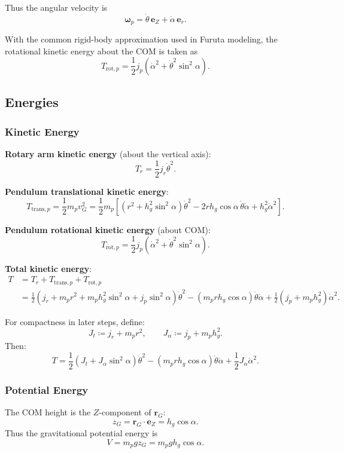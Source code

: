 \documentclass[12pt,a4paper]{article}
\begin{document}
Thus the angular velocity is
\[
\bm\omega_p=\dot\theta\,\bm e_Z+\dot\alpha\,\bm e_r.
\]

With the common rigid-body approximation used in Furuta modeling,
the rotational kinetic energy about the COM is taken as
\[
T_{\text{rot},p}=\frac{1}{2}j_p\left(\dot\alpha^2+\dot\theta^2\sin^2\alpha\right).
\]

\subsection{Energies}

\subsubsection{Kinetic Energy}

\textbf{Rotary arm kinetic energy} (about the vertical axis):
\[
T_r=\frac{1}{2}j_r\dot\theta^2.
\]

\textbf{Pendulum translational kinetic energy}:
\[
T_{\text{trans},p}=\frac{1}{2}m_p v_G^2
=\frac{1}{2}m_p\left[\left(r^2+h_g^2\sin^2\alpha\right)\dot\theta^2
-2r h_g\cos\alpha\,\dot\theta\dot\alpha
+h_g^2\dot\alpha^2\right].
\]

\textbf{Pendulum rotational kinetic energy} (about COM):
\[
T_{\text{rot},p}=\frac{1}{2}j_p\left(\dot\alpha^2+\dot\theta^2\sin^2\alpha\right).
\]

\textbf{Total kinetic energy}:
\begin{align*}
T
&=T_r+T_{\text{trans},p}+T_{\text{rot},p}\\[4pt]
&=\frac{1}{2}\left(j_r+m_p r^2+m_p h_g^2\sin^2\alpha+j_p\sin^2\alpha\right)\dot\theta^2
-\left(m_p r h_g\cos\alpha\right)\dot\theta\dot\alpha
+\frac{1}{2}\left(j_p+m_p h_g^2\right)\dot\alpha^2.
\end{align*}

For compactness in later steps, define:
\[
J_t \coloneqq j_r+m_p r^2,
\qquad
J_\alpha \coloneqq j_p+m_p h_g^2.
\]
Then:
\[
T=\frac{1}{2}\left(J_t+J_\alpha\sin^2\alpha\right)\dot\theta^2
-\left(m_p r h_g\cos\alpha\right)\dot\theta\dot\alpha
+\frac{1}{2}J_\alpha\dot\alpha^2.
\]

\subsubsection{Potential Energy}

The COM height is the $Z$-component of $\bm r_G$:
\[
z_G=\bm r_G\cdot\bm e_Z=h_g\cos\alpha.
\]
Thus the gravitational potential energy is
\[
V=m_p g z_G=m_p g h_g\cos\alpha.
\]
\end{document}
